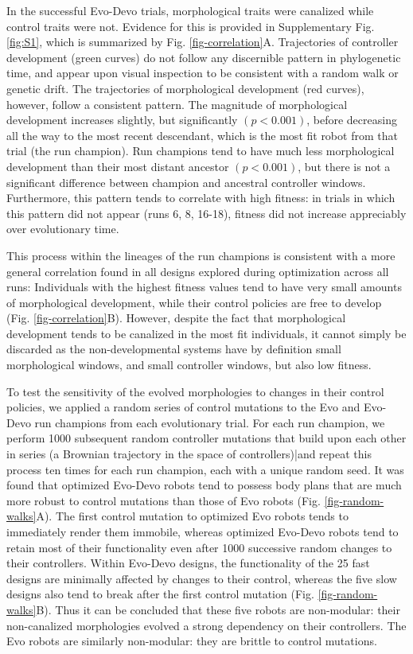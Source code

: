 In the successful Evo-Devo trials, morphological traits were canalized while control traits were not.
Evidence for this is provided in Supplementary Fig. \ref{fig:S1},%
which is summarized by Fig. \ref{fig-correlation}A.
Trajectories of controller development (green curves) do not follow any discernible pattern in phylogenetic time, and appear upon visual inspection to be consistent with a random walk or genetic drift.
The trajectories of morphological development (red curves), however, follow a consistent pattern.
The magnitude of morphological development increases slightly, but significantly $(p<0.001)$, before decreasing all the way to the most recent descendant, which is the most fit robot from that trial (the run champion). 
Run champions tend to have much less morphological development than their most distant ancestor $(p<0.001)$, but there is not a significant difference between champion and ancestral controller windows.
Furthermore, this pattern tends to correlate with high fitness: in trials in which this pattern did not appear (runs 6, 8, 16-18), fitness did not increase appreciably over evolutionary time.

This process within the lineages of the run champions is consistent with a more general correlation found in all designs explored during optimization across all runs: Individuals with the highest fitness values tend to have very small amounts of morphological development, while their control policies are free to develop (Fig. \ref{fig-correlation}B).
However, despite the fact that morphological development tends to be canalized in the most fit individuals, it cannot simply be discarded as the non-developmental systems have by definition small morphological windows, and small controller windows, but also low fitness.  


To test the sensitivity of the evolved morphologies to changes in their control policies, we applied a random series of control mutations to the Evo and Evo-Devo run champions from each evolutionary trial.
For each run champion, we perform 1000 subsequent random controller mutations that build upon each other in series (a Brownian trajectory in the space of controllers)|and repeat this process ten times for each run champion, each with a unique random seed.
It was found that optimized Evo-Devo robots tend to possess body plans that are much more robust to control mutations than those of Evo robots (Fig. \ref{fig-random-walks}A).
The first control mutation to optimized Evo robots tends to immediately render them immobile, whereas optimized Evo-Devo robots tend to retain most of their functionality even after 1000 successive random changes to their controllers.
Within Evo-Devo designs, the functionality of the 25 fast designs are minimally affected by changes to their control, whereas the five slow designs also tend to break after the first control mutation (Fig. \ref{fig-random-walks}B). 
Thus it can be concluded that these five robots are non-modular: their non-canalized morphologies evolved a strong dependency on their controllers. 
The Evo robots are similarly non-modular: they are brittle to control mutations. 


